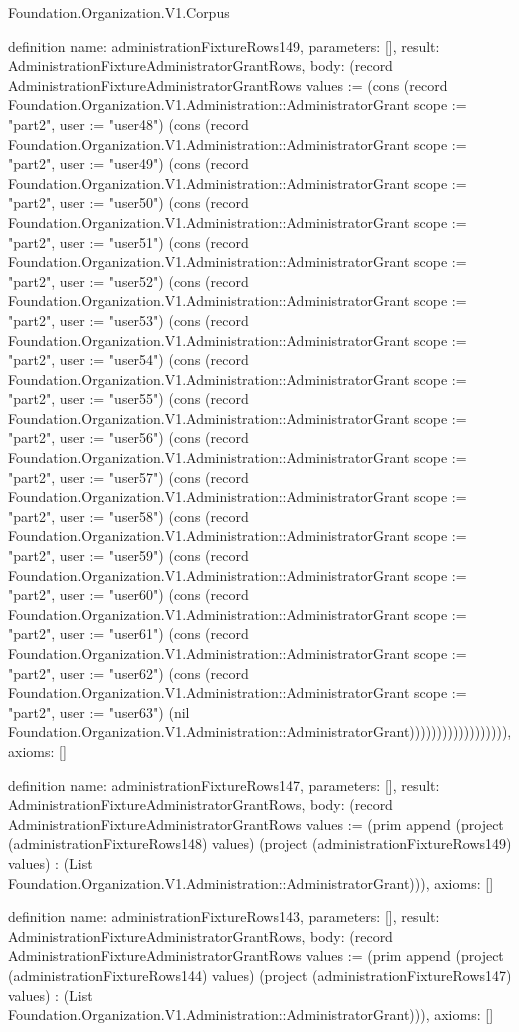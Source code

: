 \begin{lexlean}{Foundation.Organization.V1.Corpus}
\begin{semanticmodule}
definition{
  name: administrationFixtureRows149,
  parameters: [],
  result: AdministrationFixtureAdministratorGrantRows,
  body: (record AdministrationFixtureAdministratorGrantRows {values := (cons (record Foundation.Organization.V1.Administration::AdministratorGrant {scope := "part2", user := "user48"}) (cons (record Foundation.Organization.V1.Administration::AdministratorGrant {scope := "part2", user := "user49"}) (cons (record Foundation.Organization.V1.Administration::AdministratorGrant {scope := "part2", user := "user50"}) (cons (record Foundation.Organization.V1.Administration::AdministratorGrant {scope := "part2", user := "user51"}) (cons (record Foundation.Organization.V1.Administration::AdministratorGrant {scope := "part2", user := "user52"}) (cons (record Foundation.Organization.V1.Administration::AdministratorGrant {scope := "part2", user := "user53"}) (cons (record Foundation.Organization.V1.Administration::AdministratorGrant {scope := "part2", user := "user54"}) (cons (record Foundation.Organization.V1.Administration::AdministratorGrant {scope := "part2", user := "user55"}) (cons (record Foundation.Organization.V1.Administration::AdministratorGrant {scope := "part2", user := "user56"}) (cons (record Foundation.Organization.V1.Administration::AdministratorGrant {scope := "part2", user := "user57"}) (cons (record Foundation.Organization.V1.Administration::AdministratorGrant {scope := "part2", user := "user58"}) (cons (record Foundation.Organization.V1.Administration::AdministratorGrant {scope := "part2", user := "user59"}) (cons (record Foundation.Organization.V1.Administration::AdministratorGrant {scope := "part2", user := "user60"}) (cons (record Foundation.Organization.V1.Administration::AdministratorGrant {scope := "part2", user := "user61"}) (cons (record Foundation.Organization.V1.Administration::AdministratorGrant {scope := "part2", user := "user62"}) (cons (record Foundation.Organization.V1.Administration::AdministratorGrant {scope := "part2", user := "user63"}) (nil Foundation.Organization.V1.Administration::AdministratorGrant)))))))))))))))))}),
  axioms: []
}

definition{
  name: administrationFixtureRows147,
  parameters: [],
  result: AdministrationFixtureAdministratorGrantRows,
  body: (record AdministrationFixtureAdministratorGrantRows {values := (prim append (project (administrationFixtureRows148) values) (project (administrationFixtureRows149) values) : (List Foundation.Organization.V1.Administration::AdministratorGrant))}),
  axioms: []
}

definition{
  name: administrationFixtureRows143,
  parameters: [],
  result: AdministrationFixtureAdministratorGrantRows,
  body: (record AdministrationFixtureAdministratorGrantRows {values := (prim append (project (administrationFixtureRows144) values) (project (administrationFixtureRows147) values) : (List Foundation.Organization.V1.Administration::AdministratorGrant))}),
  axioms: []
}


\end{semanticmodule}
\end{lexlean}
